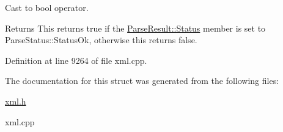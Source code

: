 Cast to bool operator. 

\begin{DoxyReturn}{Returns}
This returns true if the \hyperlink{structphys_1_1xml_1_1ParseResult_a1bf9dfeebdb07656723bbaf18ab612b5}{ParseResult::Status} member is set to ParseStatus::StatusOk, otherwise this returns false. 
\end{DoxyReturn}


Definition at line 9264 of file xml.cpp.



The documentation for this struct was generated from the following files:\begin{DoxyCompactItemize}
\item 
\hyperlink{xml_8h}{xml.h}\item 
xml.cpp\end{DoxyCompactItemize}
